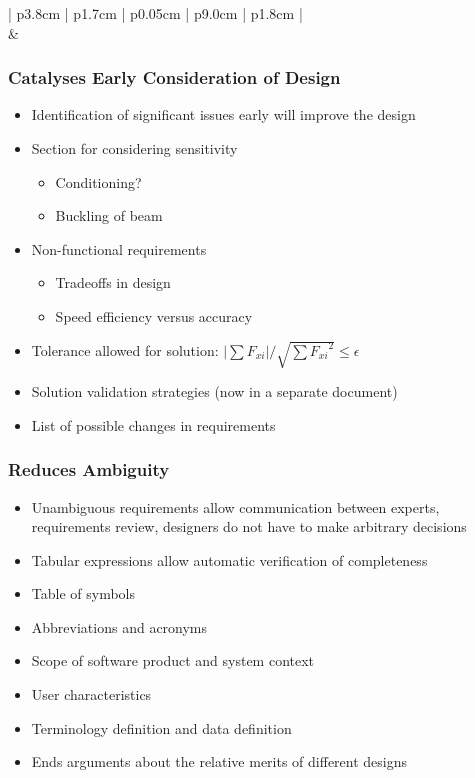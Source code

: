 \documentclass[t,12pt,numbers,fleqn]{beamer}
\begin{document}
\begin{frame}
{\begin{tabular}{| p{3.8cm} | p{1.7cm} | p{0.05cm} | p{9.0cm} | p{1.8cm} |}
 \\
 &  \\
\end{tabular} }
\end{frame}


\begin{frame}
\frametitle{Catalyses Early Consideration of Design}
\begin{itemize}
\item Identification of significant issues early will improve the design
\item Section for considering sensitivity
\begin{itemize}
\item Conditioning?
\item Buckling of beam
\end{itemize}
\item Non-functional requirements
\begin{itemize}
\item Tradeoffs in design
\item Speed efficiency versus accuracy
\end{itemize}
\item Tolerance allowed for solution: $|\sum{F_{xi}}| / \sqrt{\sum{F_{xi}}^2} \le \epsilon$
\item Solution validation strategies (now in a separate document)
\item List of possible changes in requirements
\end{itemize}
\end{frame}


\begin{frame}
\frametitle{Reduces Ambiguity}
\begin{itemize}
\item Unambiguous requirements allow communication between experts, requirements review, designers do not have to
make arbitrary decisions
\item Tabular expressions allow automatic verification of completeness
\item Table of symbols
\item Abbreviations and acronyms
\item Scope of software product and system context
\item User characteristics
\item Terminology definition and data definition
\item Ends arguments about the relative merits of different designs
\end{itemize}
\end{frame}
\end{document}
